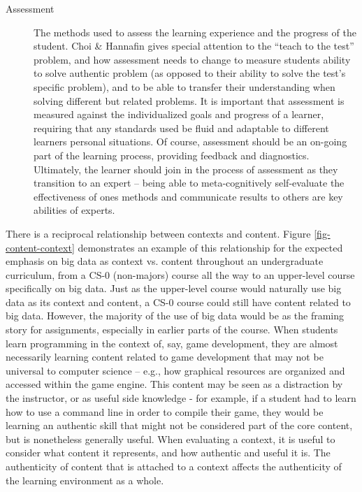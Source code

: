 \begin{description}
	\item[Assessment] The methods used to assess the learning experience and the progress of the student.
	Choi \& Hannafin gives special attention to the “teach to the test” problem, and how assessment needs to change to measure students ability to solve authentic problem (as opposed to their ability to solve the test’s specific problem), and to be able to transfer their understanding when solving different but related problems.
	It is important that assessment is measured against the individualized goals and progress of a learner, requiring that any standards used be fluid and adaptable to different learners personal situations.
	Of course, assessment should be an on-going part of the learning process, providing feedback and diagnostics.
	Ultimately, the learner should join in the process of assessment as they transition to an expert – being able to meta-cognitively self-evaluate the effectiveness of ones methods and communicate results to others are key abilities of experts. 
\end{description}

There is a reciprocal relationship between contexts and content.
Figure \ref{fig-content-context} demonstrates an example of this relationship for the expected emphasis on big data as context vs. content throughout an undergraduate curriculum, from a CS-0 (non-majors) course all the way to an upper-level course specifically on big data.
Just as the upper-level course would naturally use big data as its context and content, a CS-0 course could still have content related to big data.
However, the majority of the use of big data would be as the framing story for assignments, especially in earlier parts of the course.
When students learn programming in the context of, say, game development, they are almost necessarily learning content related to game development that may not be universal to computer science -- e.g., how graphical resources are organized and accessed within the game engine.
This content may be seen as a distraction by the instructor, or as useful side knowledge - for example, if a student had to learn how to use a command line in order to compile their game, they would be learning an authentic skill that might not be considered part of the core content, but is nonetheless generally useful.
When evaluating a context, it is useful to consider what content it represents, and how authentic and useful it is.
The authenticity of content that is attached to a context affects the authenticity of the learning environment as a whole.

